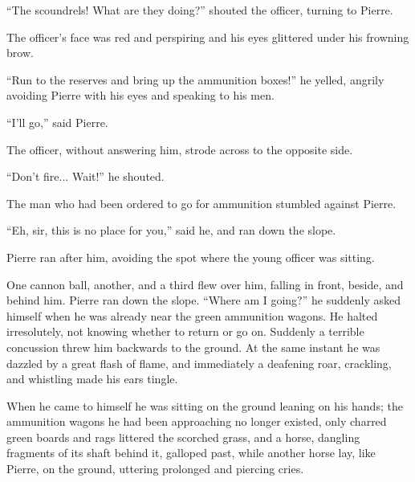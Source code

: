 ``The scoundrels! What are they doing?'' shouted the officer,
turning to Pierre.

The officer's face was red and perspiring and his eyes glittered
under his frowning brow.

``Run to the reserves and bring up the ammunition boxes!'' he
yelled, angrily avoiding Pierre with his eyes and speaking to his
men.

``I'll go,'' said Pierre.

The officer, without answering him, strode across to the opposite
side.

``Don't fire... Wait!'' he shouted.

The man who had been ordered to go for ammunition stumbled
against Pierre.

``Eh, sir, this is no place for you,'' said he, and ran down the
slope.

Pierre ran after him, avoiding the spot where the young officer
was sitting.

One cannon ball, another, and a third flew over him, falling in
front, beside, and behind him. Pierre ran down the slope. ``Where
am I going?''  he suddenly asked himself when he was already near
the green ammunition wagons. He halted irresolutely, not knowing
whether to return or go on.  Suddenly a terrible concussion threw
him backwards to the ground. At the same instant he was dazzled
by a great flash of flame, and immediately a deafening roar,
crackling, and whistling made his ears tingle.

When he came to himself he was sitting on the ground leaning on
his hands; the ammunition wagons he had been approaching no
longer existed, only charred green boards and rags littered the
scorched grass, and a horse, dangling fragments of its shaft
behind it, galloped past, while another horse lay, like Pierre,
on the ground, uttering prolonged and piercing cries.


